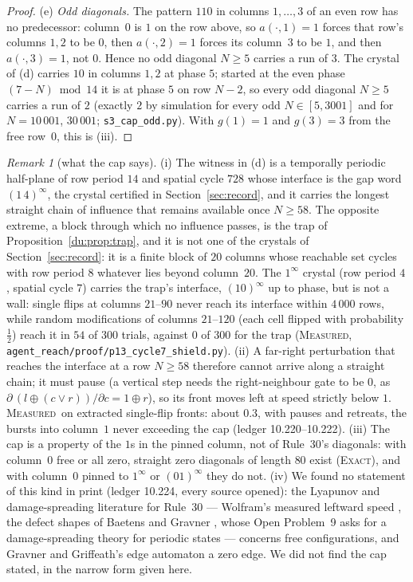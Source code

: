 \documentclass[11pt]{article}
\theoremstyle{definition}
\theoremstyle{remark}
\newtheorem{remark}[theorem]{Remark}
\newcommand{\EXACT}{\textsc{Exact}}
\newcommand{\MEASURED}{\textsc{Measured}}
\begin{document}
\begin{proof}
(e) \emph{Odd diagonals.} The pattern $110$ in columns $1,\dots,3$ of an even row has no predecessor:
column~$0$ is $1$ on the row above, so $a(\cdot,1)=1$ forces that row's columns $1,2$ to be $0$, then
$a(\cdot,2)=1$ forces its column~$3$ to be $1$, and then $a(\cdot,3)=1$, not $0$. Hence no odd diagonal
$N\ge5$ carries a run of $3$. The crystal of (d) carries $10$ in columns $1,2$ at phase $5$; started at
the even phase $(7-N)\bmod14$ it is at phase $5$ on row $N-2$, so every odd diagonal $N\ge5$ carries a
run of $2$ (exactly $2$ by simulation for every odd $N\in[5,3001]$ and for $N=10\,001$, $30\,001$;
\texttt{s3\_cap\_odd.py}). With $g(1)=1$ and $g(3)=3$ from the free row~$0$, this is (iii).
\end{proof}

\begin{remark}[what the cap says]\label{du:rem:cap}
(i) The witness in (d) is a temporally periodic half-plane of row period $14$ and spatial cycle $728$
whose interface is the gap word $(1\,4)^{\infty}$, the crystal certified in
Section~\ref{sec:record}, and it carries the longest straight chain of influence that remains available
once $N\ge58$. The opposite extreme, a block through which no influence passes, is the trap of
Proposition~\ref{du:prop:trap}, and it is not one of the crystals of Section~\ref{sec:record}: it is a
finite block of $20$ columns whose reachable set cycles with row period $8$ whatever lies beyond
column~$20$. The $1^{\infty}$ crystal (row period $4$, spatial cycle $7$) carries the trap's interface,
$(10)^{\infty}$ up to phase, but is not a wall: single flips at columns $21$--$90$ never reach its interface within
$4\,000$ rows, while random modifications of columns $21$--$120$ (each cell flipped with probability
$\tfrac12$) reach it in $54$ of $300$ trials, against $0$ of $300$ for the trap (\MEASURED,
\texttt{agent\_reach/proof/p13\_cycle7\_shield.py}). (ii) A far-right
perturbation that reaches the interface at a row $N\ge58$ therefore cannot arrive along a straight
chain; it must pause (a vertical step needs the right-neighbour gate to be $0$, as
$\partial\,(l\oplus(c\vee r))/\partial c=1\oplus r$), so its front moves left at speed strictly below
$1$. \MEASURED\ on extracted single-flip fronts: about $0.3$, with pauses and retreats, the bursts into
column~$1$ never exceeding the cap (ledger 10.220--10.222). (iii) The cap is a property of the $1$s in
the pinned column, not of Rule~30's diagonals: with column~$0$ free or all zero, straight zero diagonals
of length $80$ exist (\EXACT), and with column~$0$ pinned to $1^{\infty}$ or $(01)^{\infty}$ they do
not. (iv) We found no statement of this kind in print (ledger 10.224, every source opened): the
Lyapunov and damage-spreading literature for Rule~30 --- Wolfram's measured leftward speed
\cite[p.~949]{NKS}, the defect shapes of Baetens and Gravner \cite{BGrav}, whose Open Problem~9 asks
for a damage-spreading theory for periodic states --- concerns free configurations, and Gravner and
Griffeath's edge automaton \cite{GG} a zero edge. We did not find the cap stated, in the narrow form given here.
\end{remark}
\end{document}
